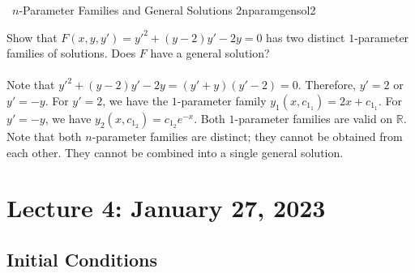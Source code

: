        \begin{example}{\Difficulty\,\Difficulty\,\,\(n\)-Parameter Families and General Solutions 2}{nparamgensol2}

            Show that \(F(x,y,y')=y'^2+(y-2)y'-2y=0\) has two distinct \(1\)-parameter families of solutions. Does \(F\) have a general solution?
            \\
            \\
            Note that \(y'^2+(y-2)y'-2y=(y'+y)(y'-2)=0\). Therefore, \(y'=2\) or \(y'=-y\). For \(y'=2\), we have the \(1\)-parameter family \(y_1(x,c_{1_1})=2x+c_{1_1}\). For \(y'=-y\), we have \(y_2(x,c_{1_2})=c_{1_2}e^{-x}\). Both \(1\)-parameter families are valid on \(\mathbb{R}\). Note that both \(n\)-parameter families are distinct; they cannot be obtained from each other. They cannot be combined into a single general solution.
        \end{example}

        \pagebreak

\section{Lecture 4: January 27, 2023}

    \subsection{Initial Conditions}

